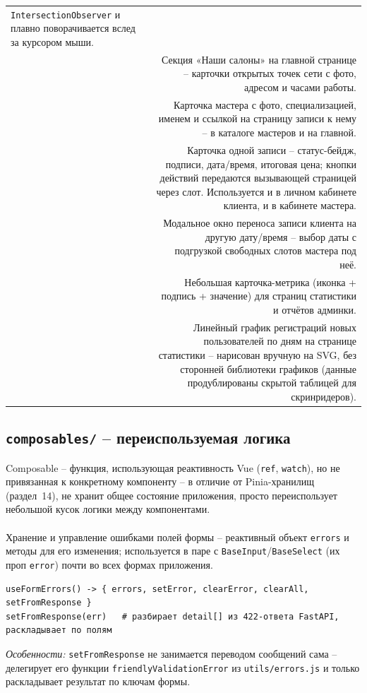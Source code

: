 \begin{xltabular}{\textwidth}{M D}
  \texttt{IntersectionObserver} и плавно поворачивается вслед за
  курсором мыши. \\
 & Секция «Наши салоны» на главной странице --
  карточки открытых точек сети с фото, адресом и часами работы. \\
 & Карточка мастера с фото, специализацией,
  именем и ссылкой на страницу записи к нему -- в каталоге мастеров и на
  главной. \\
 & Карточка одной записи -- статус-бейдж,
  подписи, дата/время, итоговая цена; кнопки действий передаются
  вызывающей страницей через слот. Используется и в личном кабинете
  клиента, и в кабинете мастера. \\
 & Модальное окно переноса записи клиента на
  другую дату/время -- выбор даты с подгрузкой свободных слотов мастера
  под неё. \\
 & Небольшая карточка-метрика (иконка + подпись +
  значение) для страниц статистики и отчётов админки. \\
 & Линейный график регистраций новых
  пользователей по дням на странице статистики -- нарисован вручную на
  SVG, без сторонней библиотеки графиков (данные продублированы скрытой
  таблицей для скринридеров). \\
\end{xltabular}

\subsection{\texttt{composables/} -- переиспользуемая логика}

Composable -- функция, использующая реактивность Vue (\texttt{ref},
\texttt{watch}), но не привязанная к конкретному компоненту -- в отличие
от Pinia-хранилищ (раздел~14), не хранит общее состояние приложения,
просто переиспользует небольшой кусок логики между компонентами.

\paragraph{}
Хранение и управление ошибками полей формы -- реактивный объект
\texttt{errors} и методы для его изменения; используется в паре с
\texttt{BaseInput}/\texttt{BaseSelect} (их проп \texttt{error}) почти во
всех формах приложения.
\begin{verbatim}
useFormErrors() -> { errors, setError, clearError, clearAll, setFromResponse }
setFromResponse(err)   # разбирает detail[] из 422-ответа FastAPI, раскладывает по полям
\end{verbatim}
\textit{Особенности:} \texttt{setFromResponse} не занимается переводом
сообщений сама -- делегирует его функции
\texttt{friendlyValidationError} из \texttt{utils/errors.js} и только
раскладывает результат по ключам формы.

